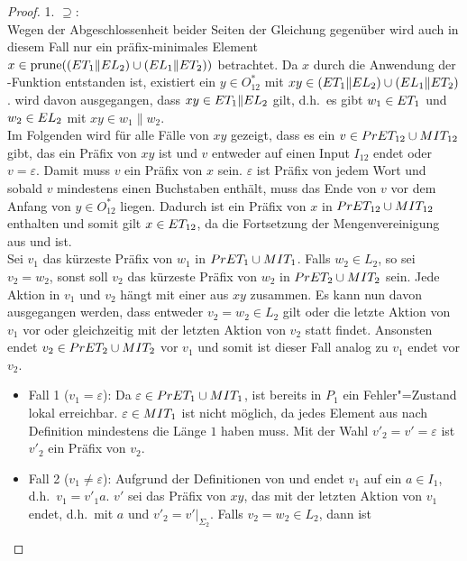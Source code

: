 \begin{proof}
  1. \glqq$\supseteq$\grqq{}:\\
  Wegen der Abgeschlossenheit beider Seiten der Gleichung gegenüber \cont{}
  wird auch in diesem Fall nur ein präfix-minimales Element $x\in\mathrm{prune} ((ET
  _1\|EL _2)\cup (EL _1\| ET _2))$ betrachtet. Da $x$ durch die Anwendung
  der \prune{}-Funktion entstanden ist, existiert ein $y\in O_{12} ^*$ mit
  $xy\in (ET _1\|EL _2)\cup (EL _1\| ET _2)$. \OBdA{} wird davon
  ausgegangen, dass $xy\in ET _1\| EL _2$ gilt, d.h.\ es gibt $w_1\in ET _1$
  und $w_2\in EL _2$ mit $xy \in w_1\| w_2$.\\
  Im Folgenden wird für alle Fälle von $xy$ gezeigt, dass es ein $v\in PrET
  _{12} \cup MIT _{12}$ gibt, das ein Präfix von $xy$ ist und $v$ entweder auf
  einen Input $I_{12}$ endet oder $v=\varepsilon$. Damit muss $v$ ein Präfix
  von $x$ sein. $\varepsilon$ ist Präfix von jedem Wort und sobald $v$
  mindestens einen Buchstaben enthält, muss das Ende von $v$ vor dem Anfang von
  $y\in O_{12}^*$ liegen. Dadurch ist ein Präfix von $x$ in $PrET _{12}\cup
  MIT _{12}$ enthalten und somit gilt $x\in ET _{12}$, da \ET{} die
  Fortsetzung der Mengenvereinigung aus \PrET{} und \MIT{} ist.\\
  Sei $v_1$ das kürzeste Präfix von $w_1$ in $PrET _1\cup MIT _1$. Falls $w_2
  \in L_2$, so sei $v_2=w_2$, sonst soll $v_2$ das kürzeste Präfix von $w_2$ in
  $PrET _2\cup MIT _2$ sein. Jede Aktion in $v_1$ und $v_2$ hängt mit einer
  aus $xy$ zusammen. Es kann nun davon ausgegangen werden, dass entweder $v_2 =
  w_2\in L_2$ gilt oder die letzte Aktion von $v_1$ vor oder gleichzeitig mit
  der letzten Aktion von $v_2$ statt findet. Ansonsten endet $v_2 \in PrET
  _2\cup MIT _2$ vor $v_1$ und somit ist dieser Fall analog zu $v_1$ endet vor
  $v_2$.
  \begin{itemize}
    \item Fall 1 ($v_1=\varepsilon$): Da $\varepsilon\in PrET _1\cup MIT _1$,
      ist bereits in $P_1$ ein Fehler"=Zustand lokal erreichbar. $\varepsilon
      \in MIT _1$ ist nicht möglich, da jedes Element aus \MIT{} nach
      Definition mindestens die Länge $1$ haben muss. Mit der Wahl
      $v'_2=v'=\varepsilon$ ist $v'_2$ ein Präfix von $v_2$.
    \item Fall 2 ($v_1\neq\varepsilon$): Aufgrund der Definitionen von \PrET{}
      und \MIT{} endet $v_1$ auf ein $a\in I_1$, d.h.\ $v_1=v'_1a$. $v'$ sei
      das Präfix von $xy$, das mit der letzten Aktion von $v_1$ endet, d.h.\
      mit $a$ und $v'_2=v'|_{\Sigma _2}$. Falls $v_2=w_2\in L_2$, dann ist

\end{itemize}
\end{proof}
